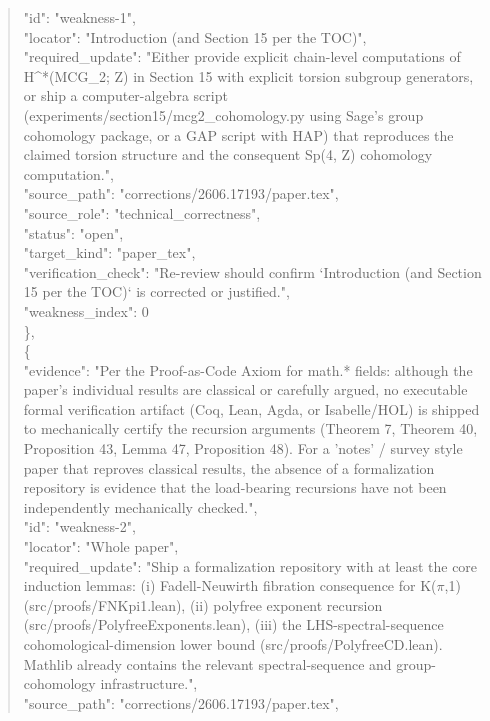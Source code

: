 \documentclass[11pt]{article}
\begin{document}
\begin{quote}
      "id": "weakness-1",\\
      "locator": "Introduction (and Section 15 per the TOC)",\\
      "required\_update": "Either provide explicit chain-level computations of H\^{}*(MCG\_2; Z) in Section 15 with explicit torsion subgroup generators, or ship a computer-algebra script (experiments/section15/mcg2\_cohomology.py using Sage's group cohomology package, or a GAP script with HAP) that reproduces the claimed torsion structure and the consequent Sp(4, Z) cohomology computation.",\\
      "source\_path": "corrections/2606.17193/paper.tex",\\
      "source\_role": "technical\_correctness",\\
      "status": "open",\\
      "target\_kind": "paper\_tex",\\
      "verification\_check": "Re-review should confirm `Introduction (and Section 15 per the TOC)` is corrected or justified.",\\
      "weakness\_index": 0\\
    \},\\
    \{\\
      "evidence": "Per the Proof-as-Code Axiom for math.* fields: although the paper's individual results are classical or carefully argued, no executable formal verification artifact (Coq, Lean, Agda, or Isabelle/HOL) is shipped to mechanically certify the recursion arguments (Theorem 7, Theorem 40, Proposition 43, Lemma 47, Proposition 48). For a 'notes' / survey style paper that reproves classical results, the absence of a formalization repository is evidence that the load-bearing recursions have not been independently mechanically checked.",\\
      "id": "weakness-2",\\
      "locator": "Whole paper",\\
      "required\_update": "Ship a formalization repository with at least the core induction lemmas: (i) Fadell-Neuwirth fibration consequence for K(\ensuremath{\pi},1) (src/proofs/FNKpi1.lean), (ii) polyfree exponent recursion (src/proofs/PolyfreeExponents.lean), (iii) the LHS-spectral-sequence cohomological-dimension lower bound (src/proofs/PolyfreeCD.lean). Mathlib already contains the relevant spectral-sequence and group-cohomology infrastructure.",\\
      "source\_path": "corrections/2606.17193/paper.tex",\\

\end{quote}
\end{document}
